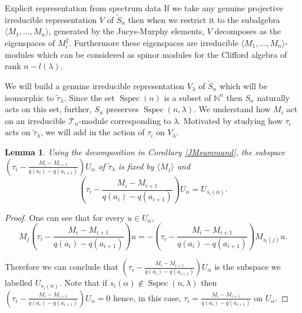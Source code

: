 \documentclass[a4paper,10pt]{amsart}
\newtheorem{lemma}[theorem]{Lemma}
\DeclareMathOperator{\Sspec}{Sspec}
\begin{document}
\begin{section}{Explicit representation from spectrum data}
If we take any genuine projective irreducible representation $V$ of $\tilde{S}_n$ then when we restrict it to the subalgebra $\langle M_1,\ldots ,M_n \rangle$, generated by the Jucys-Murphy elements, $V$ decomposes as the eigenspaces of $M_i^2$. Furthermore these eigenspaces are irreducible $\langle M_1,\ldots ,M_n \rangle$-modules which can be considered as spinor modules for the Clifford algebra of rank $n- l(\lambda)$.


We will build a genuine irreducible representation $V_\lambda$ of $\tilde{S}_n$ which will be isomorphic to $\tilde{\tau}_\lambda$. Since the set $\Sspec(n)$ is a subset of $\mathbb{N}^n$ then $S_n$ naturally acts on this set, further, $S_n$ preserves $\Sspec(n,\lambda)$. We understand how $M_i$ act on an irreducible $\mathcal{T}_n$-module corresponding to $\lambda$. Motivated by studying how $\tau_i$ acts on $\tilde{\tau}_\lambda$, we will add in the action of $\tau_i$ on $V_\lambda$.





 \begin{lemma}\label{negative} Using the decomposition in Corollary \ref{JMsummand}, the subspace $(\tau_i - \frac{M_i -M_{i+1}}{q(a_i) - q(a_{i+1})} ) U_\alpha$ of $\tilde{\tau}_\lambda$ is fixed by $\langle M_j \rangle$ and
$$\left(\tau_i - \frac{M_i -M_{i+1}}{q(a_i) - q(a_{i+1})} \right) U_\alpha =U_{s_i(\alpha)}.$$ \end{lemma} 
\begin{proof} One can see that for every $u \in U_\alpha$, 
$$M_j \left(\tau_i - \frac{M_i -M_{i+1}}{q(a_i) - q(a_{i+1})} \right)u = - \left(\tau_i - \frac{M_i -M_{i+1}}{q(a_i) - q(a_{i+1})} \right) M_{s_i(j)}u.$$ 

Therefore we can conclude that $\left(\tau_i - \frac{M_i -M_{i+1}}{q(a_i) - q(a_{i+1})} \right) U_\alpha$ is the subspace we labelled $U_{s_i(\alpha)}$. 
Note that if $s_i(\alpha) \notin \Sspec(n,\lambda)$ then $\left(\tau_i - \frac{M_i -M_{i+1}}{q(a_i) - q(a_{i+1})} \right) U_\alpha = 0$ hence, in this case, $\tau_i = \frac{M_i -M_{i+1}}{q(a_i) - q(a_{i+1})}$ on $U_\alpha$.
\end{proof}


\end{section}
\end{document}
